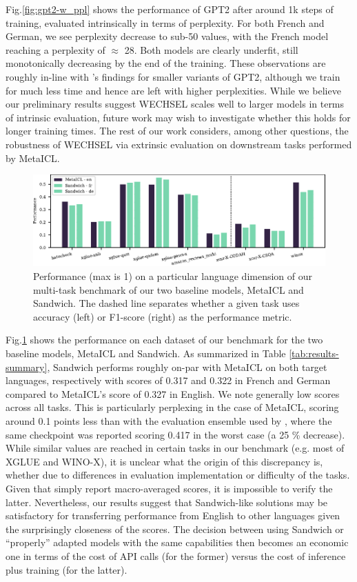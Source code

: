 \documentclass[11pt]{article}
\begin{document}
Fig.\@ \ref{fig:gpt2-w_ppl} shows the performance of GPT2 after around 1k steps of training,
evaluated intrinsically in terms of perplexity. For both French and German, we see perplexity
decrease to sub-50 values, with the French model reaching a perplexity of $\approx$ 28. Both models
are clearly underfit, still monotonically decreasing by the end of the training. These observations
are roughly in-line with \citet{minixhofer_wechsel_2022}'s findings for smaller variants of GPT2,
although we train for much less time and hence are left with higher perplexities. While we believe
our preliminary results suggest WECHSEL scales well to larger models in terms of intrinsic
evaluation, future work may wish to investigate whether this holds for longer training times. The
rest of our work considers, among other questions, the robustness of WECHSEL via extrinsic
evaluation on downstream tasks performed by MetaICL.

\begin{figure}
	\includegraphics{baselines.pdf}
	\caption{Performance (max is 1) on a particular language dimension of our multi-task benchmark of
		our two baseline models, MetaICL and Sandwich. The dashed line separates whether a given task uses
		accuracy (left) or F1-score (right) as the performance metric.}
	\label{fig:baselines}
\end{figure}

Fig.\@ \ref{fig:baselines} shows the performance on each dataset of our benchmark for the two
baseline models, MetaICL and Sandwich. As summarized in Table \ref{tab:results-summary}, Sandwich
performs roughly on-par with MetaICL on both target languages, respectively with scores of 0.317 and
0.322 in French and German compared to MetaICL's score of 0.327 in English. We note generally low
scores across all tasks. This is particularly perplexing in the case of MetaICL, scoring around
0.1 points less than with the evaluation ensemble used by \citet{min_metaicl_2022}, where the same
checkpoint was reported scoring 0.417 in the worst case (a 25 \% decrease). While similar values
are reached in certain tasks in our benchmark (e.g. most of XGLUE and WINO-X), it is unclear what
the origin of this discrepancy is, whether due to differences in evaluation implementation or
difficulty of the tasks. Given that \citet{min_metaicl_2022} simply report macro-averaged scores,
it is impossible to verify the latter. Nevertheless, our results suggest that Sandwich-like
solutions may be satisfactory for transferring performance from English to other languages given
the surprisingly closeness of the scores. The decision between using Sandwich or ``properly''
adapted models with the same capabilities then becomes an economic one in terms of the cost of API
calls (for the former) versus the cost of inference plus training (for the latter).
\end{document}
